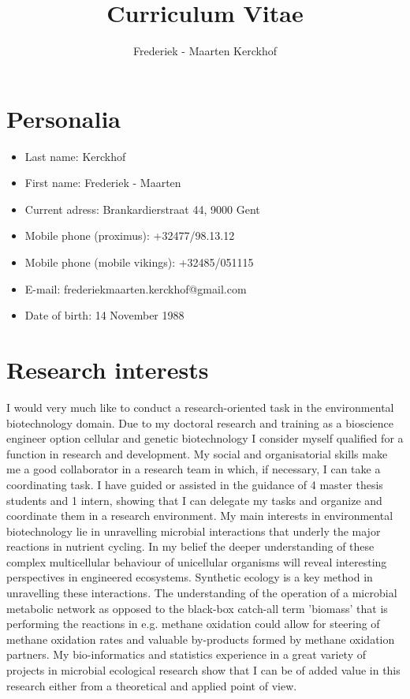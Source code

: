 \documentclass[a4paper,11pt,oneside]{article}
\title{Curriculum Vitae}
\author{Frederiek - Maarten Kerckhof}
\begin{document}
\maketitle

\section*{Personalia}
\begin{itemize}
  \item Last name: Kerckhof
  \item First name: Frederiek - Maarten
  \item Current adress: Brankardierstraat 44, 9000 Gent
  \item Mobile phone (proximus): +32477/98.13.12
  \item Mobile phone (mobile vikings): +32485/051115
  \item E-mail: frederiekmaarten.kerckhof@gmail.com
  \item Date of birth: 14 November 1988
\end{itemize}
\section*{Research interests}
I would very much like to conduct a research-oriented task in the environmental biotechnology domain. Due to my doctoral research and training as a bioscience engineer option cellular and genetic biotechnology I consider myself qualified for a function in research and development. My social and organisatorial skills make me a good collaborator in a research team in which, if necessary, I can take a coordinating task. I have guided or assisted in the guidance of 4 master thesis students and 1 intern, showing that I can delegate my tasks and organize and coordinate them in a research environment.  My main interests in environmental biotechnology lie in unravelling microbial interactions that underly the major reactions in nutrient cycling. In my belief the deeper understanding of these complex multicellular behaviour of unicellular organisms will reveal interesting perspectives in engineered ecosystems. Synthetic ecology is a key method in unravelling these interactions. The understanding of the operation of a microbial metabolic network  as opposed to the black-box catch-all term 'biomass' that is performing the reactions in e.g. methane oxidation could allow for steering of methane oxidation rates and valuable by-products formed by methane oxidation partners. My bio-informatics and statistics experience in a great variety of projects in microbial ecological research show that I can be of added value in this research either from a theoretical and applied point of view.
\end{document}
